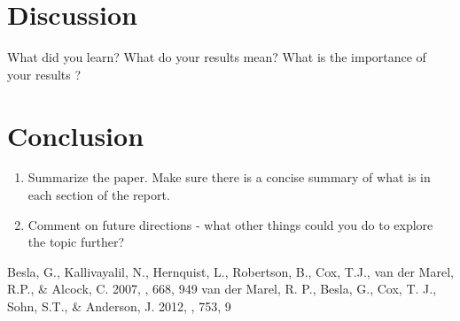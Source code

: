 \documentclass[iop]{emulateapj}
\begin{document}
\section{Discussion}

What did you learn?  What do your results mean? What is the importance of your results ? 


\section{Conclusion}

\begin{enumerate}
    \item Summarize the paper. Make sure there is a concise summary of what is in each section of the report. 
    
    \item Comment on future directions - what other things could you do to
    explore the topic further? 
    
\end{enumerate} 


\begin{thebibliography}{}
 Besla, G., Kallivayalil, N., Hernquist, L., Robertson, B., Cox, T.J., van der Marel, R.P., \& Alcock, C. 2007, \apj, 668, 949
 van der Marel, R. P., Besla, G., Cox, T. J., Sohn, S.T., \& Anderson, J. 2012, \apj, 753, 9
\end{thebibliography}


 
\end{document}
